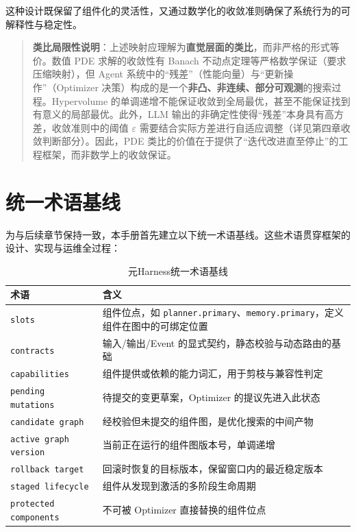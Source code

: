 这种设计既保留了组件化的灵活性，又通过数学化的收敛准则确保了系统行为的可解释性与稳定性。

\begin{quote}
\textbf{类比局限性说明}：上述映射应理解为\textbf{直觉层面的类比}，而非严格的形式等价。数值 PDE 求解的收敛性有 Banach 不动点定理等严格数学保证（要求压缩映射），但 Agent 系统中的“残差”（性能向量）与“更新操作”（Optimizer 决策）构成的是一个\textbf{非凸、非连续、部分可观测}的搜索过程。Hypervolume 的单调递增不能保证收敛到全局最优，甚至不能保证找到有意义的局部最优。此外，LLM 输出的非确定性使得“残差”本身具有高方差，收敛准则中的阈值 $\varepsilon$ 需要结合实际方差进行自适应调整（详见第四章收敛判断部分）。因此，PDE 类比的价值在于提供了“迭代改进直至停止”的工程框架，而非数学上的收敛保证。
\end{quote}

\section{统一术语基线}

为与后续章节保持一致，本手册首先建立以下统一术语基线。这些术语贯穿框架的设计、实现与运维全过程：

\begin{table}[htbp]
\centering
\caption{元Harness统一术语基线}
\label{tab:terminology-baseline}
\begin{tabular}{@{}lp{9.5cm}@{}}
\toprule
\textbf{术语} & \textbf{含义} \\
\midrule
\texttt{slots} & 组件位点，如 \texttt{planner.primary}、\texttt{memory.primary}，定义组件在图中的可绑定位置 \\
\texttt{contracts} & 输入/输出/Event 的显式契约，静态校验与动态路由的基础 \\
\texttt{capabilities} & 组件提供或依赖的能力词汇，用于剪枝与兼容性判定 \\
\texttt{pending mutations} & 待提交的变更草案，Optimizer 的提议先进入此状态 \\
\texttt{candidate graph} & 经校验但未提交的组件图，是优化搜索的中间产物 \\
\texttt{active graph version} & 当前正在运行的组件图版本号，单调递增 \\
\texttt{rollback target} & 回滚时恢复的目标版本，保留窗口内的最近稳定版本 \\
\texttt{staged lifecycle} & 组件从发现到激活的多阶段生命周期 \\
\texttt{protected components} & 不可被 Optimizer 直接替换的组件位点 \\
\bottomrule
\end{tabular}
\end{table}

